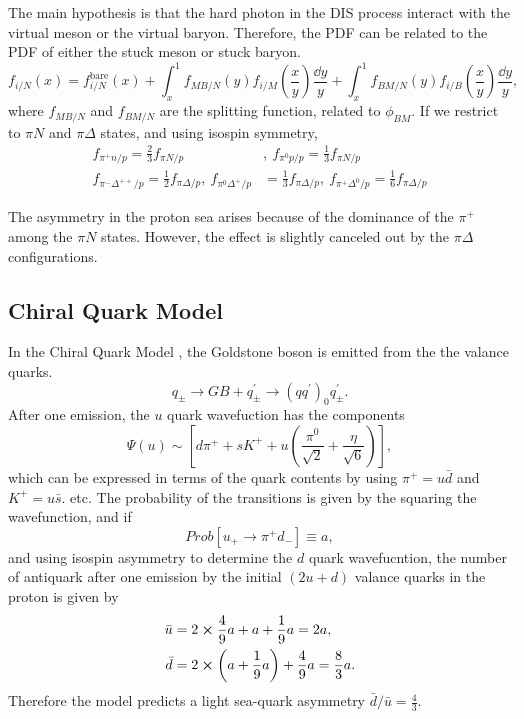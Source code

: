 \documentclass[../main.tex]{subfiles}
\begin{document}
The main hypothesis is that the hard photon in the DIS process interact with the virtual meson or the virtual
baryon. Therefore, the PDF can be related to the PDF of either the stuck meson or stuck baryon.
\begin{equation}
	f_{i/N}\left(x\right) = f_{i/N}^{\mathrm{bare}}\left(x\right) +  \int^1_x f_{MB/N}\left(y\right) f_{i/M}\left(\frac{x}{y}\right) \frac{\dd{y}}{y} + \int^1_x f_{BM/N}\left(y\right) f_{i/B}\left(\frac{x}{y}\right) \frac{\dd{y}}{y},
\end{equation}
where $f_{MB/N}$ and $f_{BM/N}$ are the splitting function, related to $\phi_{BM}$.
If we restrict to $\pi N$ and $\pi\Delta$ states, and using isospin symmetry,
\begin{align}
	f_{\pi^+n/p}=\frac{2}{3} f_{\pi N/p}                                       & , ~f_{\pi^0 p/p}=\frac{1}{3} f_{\pi N/p}                                           \\
	f_{\pi^-\Delta^{++}/p}=\frac{1}{2} f_{\pi \Delta/p}, ~f_{\pi^0 \Delta^+/p} & =\frac{1}{3} f_{\pi \Delta/p},  ~f_{\pi^+ \Delta^0/p}=\frac{1}{6} f_{\pi \Delta/p}
\end{align}

The asymmetry in the proton sea arises because of the dominance of the $\pi^+$ among the $\pi N$ states. However, the effect is slightly canceled out by the $\pi\Delta$ configurations.

\subsection{Chiral Quark Model}
In the Chiral Quark Model \cite{li1998}, the Goldstone boson is emitted from the the valance quarks.
\begin{equation}
	q_{\pm} \rightarrow GB + q^\prime_\pm \rightarrow \left(q q^\prime\right)_0 q_{\pm}^\prime.
\end{equation}
After one emission, the $u$ quark wavefuction has the components
\begin{equation}
	\Psi\left(u\right) \sim \left[d\pi^+ + s K^+ + u \left(\frac{\pi^0}{\sqrt{2}} + \frac{\eta}{\sqrt{6}}\right)\right],
\end{equation}
which can be expressed in terms of the quark contents by using $\pi^+ = u\bar{d}$ and $K^+ = u\bar{s}$. etc.
The probability of the transitions is given by the squaring the wavefunction, and if
\begin{equation}
	Prob\left[ u_+ \rightarrow \pi^+d_-\right] \equiv a,
\end{equation}
and using isospin asymmetry to determine the $d$ quark wavefucntion, the number of antiquark after one emission
by the initial $(2u+d)$ valance quarks in the proton is given by
\begin{equation}
	\begin{aligned}
		\bar{u} & = 2\cross\frac{4}{9}a +a+\frac{1}{9}a = 2a,                         \\
		\bar{d} & = 2\cross\left(a+\frac{1}{9}a\right) + \frac{4}{9}a = \frac{8}{3}a.
	\end{aligned}
\end{equation}
Therefore the model predicts a light sea-quark asymmetry $\bar{d}/\bar{u} =\frac{4}{3} $.
\end{document}
